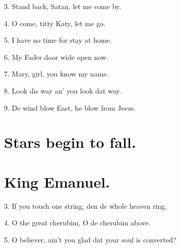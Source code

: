 \documentclass[a5paper,10pt]{book}
\begin{document}
\begin{song}

\end{song}

\begin{stanza}
\item[3.]
  Stand back, Satan, let me come by.

\item[4.]
  O come, titty Katy, let me go.

\item[5.]
  I have no time for stay at home.

\item[6.]
  My Fader door wide open now.

\item[7.]
  Mary, girl, you know my name.

\item[8.]
  Look dis way an' you look dat way.

\item[9.]
  De wind blow East, he blow from Jesus.
\end{stanza}


\newpage
\section{Stars begin to fall.}
\thispagestyle{empty}

\begin{song}

\end{song}

\newpage
\section{King Emanuel.}
\thispagestyle{empty}

\begin{song}
\end{song}

\begin{stanza}
\item[3.]
  If you touch one string, den de whole heaven ring.

\item[4.]
  O the great cherubim, O de cherubim above.

\item[5.]
  O believer, ain't you glad dat your soul is converted?
\end{stanza}
\end{document}
